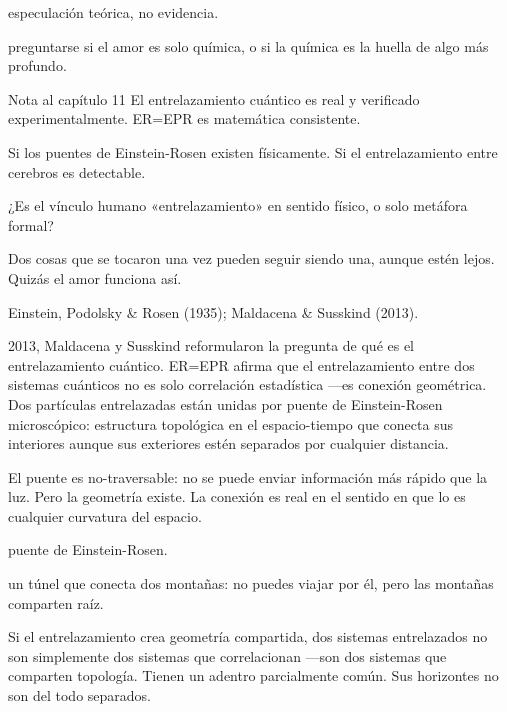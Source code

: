 \begin{fisica}
 especulación teórica, no evidencia.

 preguntarse si el amor es solo química, o si la química es la huella de algo más profundo.
\end{fisica}
\begin{notacap}{Nota al capítulo 11}
 El entrelazamiento cuántico es real y verificado experimentalmente. ER=EPR es matemática consistente.

 Si los puentes de Einstein-Rosen existen físicamente. Si el entrelazamiento entre cerebros es detectable.

 ¿Es el vínculo humano «entrelazamiento» en sentido físico, o solo metáfora formal?

 Dos cosas que se tocaron una vez pueden seguir siendo una, aunque estén lejos. Quizás el amor funciona así.

 Einstein, Podolsky \& Rosen (1935); Maldacena \& Susskind (2013).
\end{notacap}
\noindent {} 2013, Maldacena y Susskind reformularon la pregunta de qué es el entrelazamiento cuántico. ER=EPR afirma que el entrelazamiento entre dos sistemas cuánticos no es solo correlación estadística —es conexión geométrica. Dos partículas entrelazadas están unidas por puente de Einstein-Rosen microscópico: estructura topológica en el espacio-tiempo que conecta sus interiores aunque sus exteriores estén separados por cualquier distancia.

El puente es no-traversable: no se puede enviar información más rápido que la luz. Pero la geometría existe. La conexión es real en el sentido en que lo es cualquier curvatura del espacio.

\begin{fisica}
 puente de Einstein-Rosen.

 un túnel que conecta dos montañas: no puedes viajar por él, pero las montañas comparten raíz.
\end{fisica}
Si el entrelazamiento crea geometría compartida, dos sistemas entrelazados no son simplemente dos sistemas que correlacionan —son dos sistemas que comparten topología. Tienen un adentro parcialmente común. Sus horizontes no son del todo separados.

